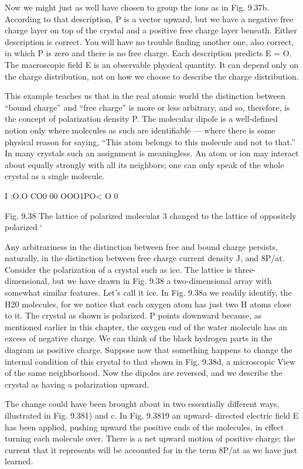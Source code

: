 {{{Now we might just as well have chosen to group the ions as in
Fig. 9.37b. According to that description, P is a vector upward, but
we have a negative free charge layer on top of the crystal and a positive
free charge layer beneath. Either description is correct. You will
have no trouble finding another one, also correct, in which P is zero
and there is no free charge. Each description predicts E = O. The
macroscopic field E is an observable physical quantity. It can depend
only on the charge distribution, not on how we choose to describe
the charge distribution.

This example teaches us that in the real atomic world the distinction
between ``bound charge'' and ``free charge'' is more or less
arbitrary, and so, therefore, is the concept of polarization density P.
The molecular dipole is a well-defined notion only where molecules
as such are identifiable --- where there is some physical reason for
saying, ``This atom belongs to this molecule and not to that.'' In
many crystals such an assignment is meaningless. An atom or ion
may interact about equally strongly with all its neighbors; one can
only speak of the whole crystal as a single molecule.

I :O.O CO0
00 OOO1PO<
O 0

Fig. 9.38 The lattice of polarized molecular 3
changed to the lattice of oppositely polarized ‘

Any arbitrariness in the distinction between free and bound charge
persists, naturally, in the distinction between free charge current
density J, and 8P/at. Consider the polarization of a crystal such as
ice. The lattice is three-dimensional, but we have drawn in Fig. 9.38
a two-dimensional array with somewhat similar features. Let's call
it ice. In Fig. 9.38a we readily identify, the H20 molecules, for we
notice that each oxygen atom has just two H atoms close to it. The
crystal as shown is polarized. P points downward because, as mentioned
earlier in this chapter, the oxygen end of the water molecule
has an excess of negative charge. We can think of the black hydrogen
parts in the diagram as positive charge. Suppose now that something
happens to change the internal condition of this crystal to that
shown in Fig. 9.38d, a microscopic View of the same neighborhood.
Now the dipoles are reversed, and we describe the crystal as having
a polarization upward.

The change could have been brought about in two essentially different
ways, illustrated in Fig. 9.381) and c. In Fig. 9.3819 an upward-
directed electric field E has been applied, pushing upward the positive
ends of the molecules, in effect turning each molecule over.
There is a net upward motion of positive charge; the current that it
represents will be accounted for in the term 8P/at as we have just
learned.

}}}
